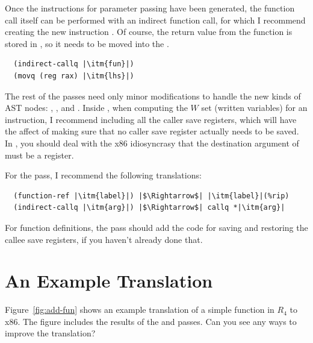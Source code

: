 \documentclass[11pt]{book}
\begin{document}
Once the instructions for parameter passing have been generated, the
function call itself can be performed with an indirect function call,
for which I recommend creating the new instruction
. Of course, the return value from the function
is stored in , so it needs to be moved into the .
\begin{lstlisting}
  (indirect-callq |\itm{fun}|)
  (movq (reg rax) |\itm{lhs}|)
\end{lstlisting}

The rest of the passes need only minor modifications to handle the new
kinds of AST nodes: , , and
. Inside , when computing the $W$ set
(written variables) for an  instruction, I
recommend including all the caller save registers, which will have the
affect of making sure that no caller save register actually needs to be
saved. In , you should deal with the x86
idiosyncrasy that the destination argument of  must be a
register.

For the  pass, I recommend the following translations:
\begin{lstlisting}
  (function-ref |\itm{label}|) |$\Rightarrow$| |\itm{label}|(%rip)
  (indirect-callq |\itm{arg}|) |$\Rightarrow$| callq *|\itm{arg}|
\end{lstlisting}
For function definitions, the  pass should add the
code for saving and restoring the callee save registers, if you
haven't already done that.

\section{An Example Translation}

Figure~\ref{fig:add-fun} shows an example translation of a simple
function in $R_4$ to x86. The figure includes the results of the
 and  passes.  Can you see any
ways to improve the translation?
\end{document}
